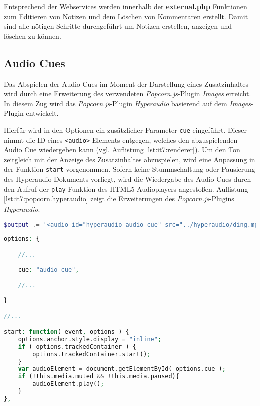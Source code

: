 Entsprechend der Webservices werden innerhalb der \textbf{external.php} Funktionen zum Editieren von Notizen und dem Löschen von Kommentaren erstellt. Damit sind alle nötigen Schritte durchgeführt um Notizen erstellen, anzeigen und löschen zu können.


\subsection{Audio Cues}
Das Abspielen der Audio Cues im Moment der Darstellung eines Zusatzinhaltes wird durch eine Erweiterung des verwendeten \textit{Popcorn.js}-Plugin \textit{Images} erreicht. In diesem Zug wird das \textit{Popcorn.js}-Plugin \textit{Hyperaudio} basierend auf dem \textit{Images}-Plugin entwickelt.

Hierfür wird in den Optionen ein zusätzlicher Parameter \texttt{cue} eingeführt. Dieser nimmt die ID eines \texttt{<audio>}-Elements entgegen, welches den abzuspielenden Audio Cue wiedergeben kann (vgl. Auflistung \ref{lst:it7:renderer}). Um den Ton zeitgleich mit der Anzeige des Zusatzinhaltes abzuspielen, wird eine Anpassung in der Funktion \texttt{start} vorgenommen. Sofern keine Stummschaltung oder Pausierung des Hyperaudio-Dokuments vorliegt, wird die Wiedergabe des Audio Cues durch den Aufruf der \texttt{play}-Funktion des HTML5-Audioplayers angestoßen. Auflistung \ref{lst:it7:popcorn.hyperaudio} zeigt die Erweiterungen des \textit{Popcorn.js}-Plugins \textit{Hyperaudio}.

\begin{lstlisting}[language=php,
             linewidth=\textwidth,
             caption={Ausschnitt der \textbf{renderer.php} in der 7. Iteration},
             label={lst:it7:renderer}]
$output .= '<audio id="hyperaudio_audio_cue" src="../hyperaudio/ding.mp3"></audio>';
\end{lstlisting}

\begin{lstlisting}[language=php,
             linewidth=\textwidth,
             caption={Ausschnitt der \textbf{popcorn.hyperaudio.js} in der 7. Iteration},
             label={lst:it7:popcorn.hyperaudio}]
options: {

    //...
    
    cue: "audio-cue",

    //...    
    
}

//...

start: function( event, options ) {
    options.anchor.style.display = "inline";
    if ( options.trackedContainer ) {
        options.trackedContainer.start();
    }
    var audioElement = document.getElementById( options.cue );
    if (!this.media.muted && !this.media.paused){
        audioElement.play();
    }
},
\end{lstlisting}

